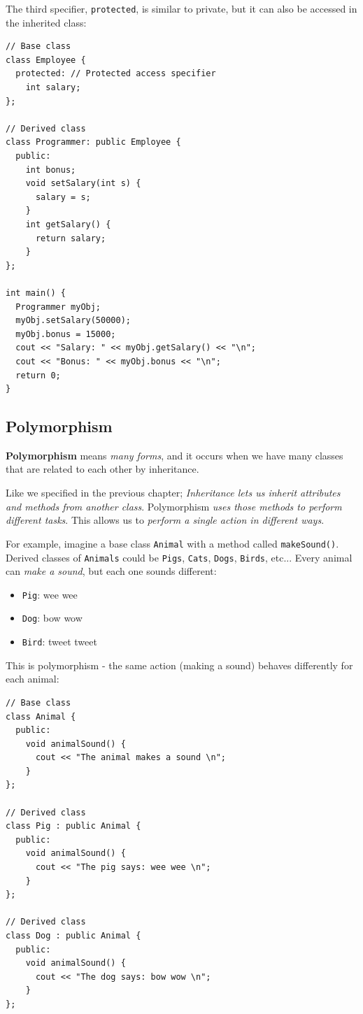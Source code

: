 \documentclass[../basic_programs.tex]{subfiles}
\begin{document}
  The third specifier, \lstinline|protected|, is similar to private, but it can also be accessed in the inherited class:

  \begin{lstlisting}[caption={caption},label=DescriptiveLabel]
// Base class
class Employee {
  protected: // Protected access specifier
    int salary;
};

// Derived class
class Programmer: public Employee {
  public:
    int bonus;
    void setSalary(int s) {
      salary = s;
    }
    int getSalary() {
      return salary;
    }
};

int main() {
  Programmer myObj;
  myObj.setSalary(50000);
  myObj.bonus = 15000;
  cout << "Salary: " << myObj.getSalary() << "\n";
  cout << "Bonus: " << myObj.bonus << "\n";
  return 0;
}
  \end{lstlisting}

  \subsection{Polymorphism}

  \textbf{Polymorphism} means \textit{many forms}, and it occurs when we have many classes that are related to each other by inheritance.

  Like we specified in the previous chapter; \textit{Inheritance lets us inherit attributes and methods from another class}. Polymorphism \textit{uses those methods to perform different tasks}. This allows us to \textit{perform a single action in different ways}.

  For example, imagine a base class \lstinline|Animal| with a method called \lstinline|makeSound()|. Derived classes of \lstinline|Animals| could be \lstinline|Pigs|, \lstinline|Cats|, \lstinline|Dogs|, \lstinline|Birds|, etc... Every animal can \textit{make a sound}, but each one sounds different:

  \begin{itemize}
    \item \lstinline|Pig|: wee wee
    \item \lstinline|Dog|: bow wow
    \item \lstinline|Bird|: tweet tweet
  \end{itemize}

  This is polymorphism - the same action (making a sound) behaves differently for each animal:

  \begin{lstlisting}[caption={caption},label=DescriptiveLabel]
// Base class
class Animal {
  public:
    void animalSound() {
      cout << "The animal makes a sound \n";
    }
};

// Derived class
class Pig : public Animal {
  public:
    void animalSound() {
      cout << "The pig says: wee wee \n";
    }
};

// Derived class
class Dog : public Animal {
  public:
    void animalSound() {
      cout << "The dog says: bow wow \n";
    }
};
  \end{lstlisting}
\end{document}

